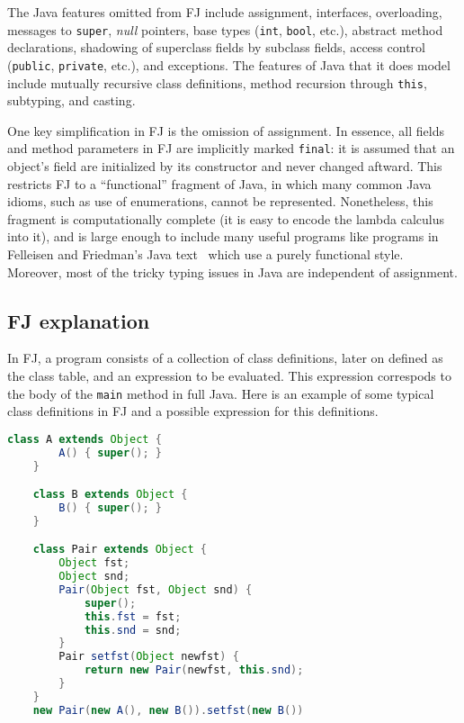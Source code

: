 The Java features omitted from FJ include assignment, interfaces, overloading,
messages to \texttt{super}, \textit{null} pointers, base types (\texttt{int},
\texttt{bool}, etc.), abstract method declarations, shadowing of superclass
fields by subclass fields, access control (\texttt{public}, \texttt{private},
etc.), and exceptions. The features of Java that it does model include mutually
recursive class definitions, method recursion through \texttt{this}, subtyping,
and casting.

One key simplification in FJ is the omission of assignment. In essence, all
fields and method parameters in FJ are implicitly marked \texttt{final}: it is
assumed that an object's field are initialized by its constructor and never
changed aftward. This restricts FJ to a ``functional'' fragment of Java, in
which many common Java idioms, such as use of enumerations, cannot be
represented. Nonetheless, this fragment is computationally complete (it is easy
to encode the lambda calculus into it), and is large enough to include many
useful programs like programs in Felleisen and Friedman's Java
text~\cite{felleisen1998} which use a purely functional style. Moreover, most
of the tricky typing issues in Java are independent of assignment. 

\subsection{FJ explanation}
In FJ, a program consists of a collection of class definitions, later on
defined as the class table, and an expression to be evaluated. This expression
correspods to the body of the \texttt{main} method in full Java. Here is an
example of some typical class definitions in FJ and a possible expression for
this definitions.

\begin{lstlisting}[language=Java]
    class A extends Object {
        A() { super(); } 
    } 

    class B extends Object { 
        B() { super(); }
    } 

    class Pair extends Object { 
        Object fst; 
        Object snd;
        Pair(Object fst, Object snd) { 
            super(); 
            this.fst = fst; 
            this.snd = snd; 
        } 
        Pair setfst(Object newfst) { 
            return new Pair(newfst, this.snd); 
        } 
    } 
    new Pair(new A(), new B()).setfst(new B())
\end{lstlisting}

